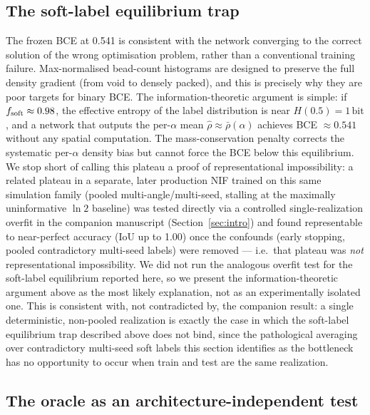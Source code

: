 \documentclass[aip,amsmath,amssymb,reprint]{revtex4-1}
\renewcommand{\ang}{\ensuremath{\alpha}} %
\begin{document}
\subsection{The soft-label equilibrium trap}
\label{ssec:disc_softtrap}

The frozen BCE at 0.541 is consistent with the network converging
to the correct solution of the wrong optimisation problem, rather
than a conventional training failure.
Max-normalised bead-count histograms are designed to preserve
the full density gradient (from void to densely packed), and
this is precisely why they are poor targets for binary BCE.
The information-theoretic argument is simple: if $f_{\rm soft} \approx 0.98$,
the effective entropy of the label distribution is near $H(0.5) = 1\,\mathrm{bit}$,
and a network that outputs the per-$\alpha$ mean
$\hat{\rho} \approx \bar{\rho}(\ang)$ achieves BCE $\approx 0.541$
without any spatial computation.
The mass-conservation penalty corrects the systematic per-$\alpha$
density bias but cannot force the BCE below this equilibrium.
We stop short of calling this plateau a proof of representational
impossibility: a related plateau in a separate, later production
NIF trained on this same simulation family
(pooled multi-angle/multi-seed, stalling at the maximally
uninformative $\ln 2$ baseline) was tested directly via a
controlled single-realization overfit in the companion manuscript
(Section~\ref{sec:intro}) and found representable to
near-perfect accuracy (IoU up to 1.00) once the confounds
(early stopping, pooled contradictory multi-seed labels) were
removed — i.e.\ that plateau was \emph{not} representational
impossibility. We did not run the analogous overfit test for the
soft-label equilibrium reported here, so we present the
information-theoretic argument above as the most likely
explanation, not as an experimentally isolated one.
This is consistent with, not contradicted by, the companion
result: a single deterministic, non-pooled realization is exactly
the case in which the soft-label equilibrium trap described above
does not bind, since the pathological averaging over contradictory
multi-seed soft labels this section identifies as the bottleneck
has no opportunity to occur when train and test are the same
realization.

\subsection{The oracle as an architecture-independent test}
\label{ssec:disc_oracle}
\end{document}
